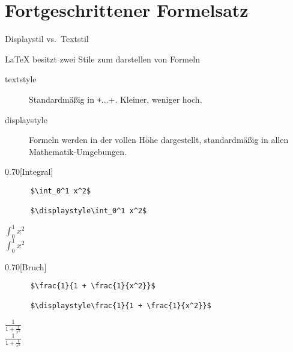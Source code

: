 \section{Fortgeschrittener Formelsatz}

\begin{frame}[fragile]{Displaystil vs.\ Textstil}

  \LaTeX{} besitzt zwei Stile zum darstellen von Formeln
  \begin{description}
    \item[textstyle] Standardmäßig in \texttt+$...$+. Kleiner, weniger hoch.
    \item[displaystyle] Formeln werden in der vollen Höhe dargestellt, standardmäßig in allen Mathematik-Umgebungen.
  \end{description}

  \begin{CodeExample}{0.70}[Integral]
    \begin{verbatim}
      $\int_0^1 x^2$

      $\displaystyle\int_0^1 x^2$
    \end{verbatim}
  \CodeResult
    \strut
    $\int_0^1 x^2$ \\[0.5\baselineskip]
    $\displaystyle\int_0^1 x^2$
  \end{CodeExample}

  \begin{CodeExample}{0.70}[Bruch]
    \begin{verbatim}
      $\frac{1}{1 + \frac{1}{x^2}}$

      $\displaystyle\frac{1}{1 + \frac{1}{x^2}}$
    \end{verbatim}
  \CodeResult
    $\frac{1}{1 + \frac{1}{x^2}}$\\[0.5\baselineskip]
    $\displaystyle\frac{1}{1 + \frac{1}{x^2}}$
  \end{CodeExample}
\end{frame}

